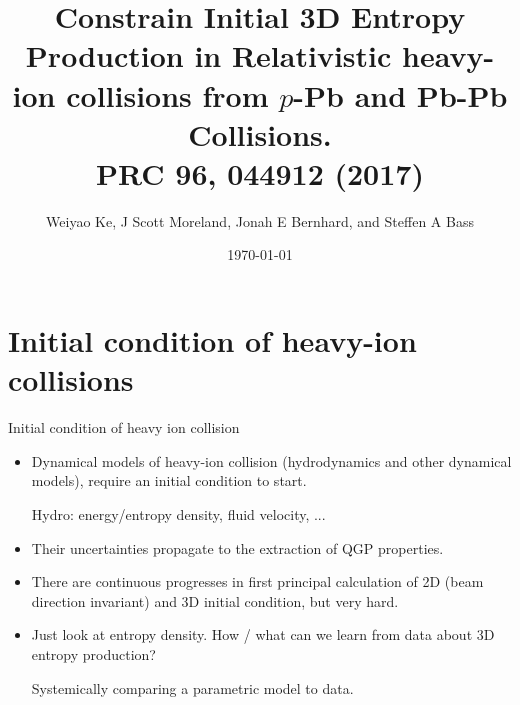 \documentclass[11pt]{beamer}
\author[Weiyao Ke]{Weiyao Ke, J Scott Moreland, Jonah E Bernhard, and Steffen A Bass}
\title[3D Initial Condition]{Constrain Initial 3D Entropy Production in Relativistic heavy-ion collisions from $p$-Pb and Pb-Pb Collisions. \\
\vspace*{0.1cm}
\small PRC 96, 044912 (2017) }
\institute{Duke University}
\date{\today}
\begin{document}
\begin{frame}
\titlepage
\end{frame}

\section{Initial condition of heavy-ion collisions}
\begin{frame}{Initial condition of heavy ion collision}
\begin{itemize}
\item Dynamical models of heavy-ion collision (hydrodynamics and other dynamical models), require an initial condition to start.\\
\begin{center}
Hydro: energy/entropy density, fluid velocity, ...
\end{center}
\item Their uncertainties propagate to the extraction of QGP properties.
\vspace*{0.3cm}
\item There are continuous progresses in first principal calculation of 2D (beam direction invariant) and 3D initial condition, but very hard.
\vspace*{0.3cm}
\item Just look at entropy density. How / what can we learn from data about 3D entropy production?
\begin{center}
\colorbox{orange!40}{Systemically comparing a parametric model to data.}
\end{center}
\end{itemize}
\end{frame}
\end{document}
